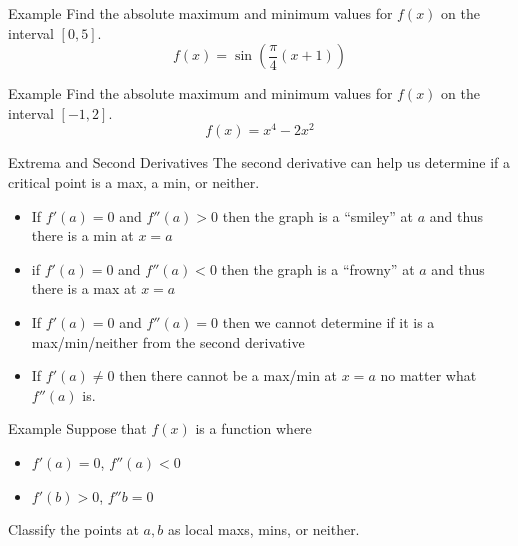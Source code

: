\documentclass[t]{beamer}
\begin{document}
\begin{frame}{Example}
Find the absolute maximum and minimum values for
$f(x)$ on the interval $[0,5]$.
$$f(x) = \sin \left( \frac{\pi}{4}(x + 1) \right)$$
\end{frame}

\begin{frame}{Example}
Find the absolute maximum and minimum values for
$f(x)$ on the interval $[-1,2]$.
$$f(x) = x^4 - 2x^2$$
\end{frame}

\begin{frame}{Extrema and Second Derivatives}
The second derivative can help us determine if a 
critical point is a max, a min, or neither.
\begin{itemize}
\item If $f'(a) = 0$ and $f''(a) > 0$ then the graph is a
``smiley'' at $a$ and thus there is a min at $x = a$
\item if $f'(a) = 0$ and $f''(a) < 0$ then the graph is a 
``frowny'' at $a$ and thus there is a max at $x = a$
\item If $f'(a) = 0$ and $f''(a) = 0$ then we cannot determine
if it is a max/min/neither from the second derivative
\item If $f'(a) \neq 0$ then there cannot be a max/min at
$x = a$ no matter what $f''(a)$ is.
\end{itemize}
\end{frame}

\begin{frame}{Example}
Suppose that $f(x)$ is a function where
\begin{itemize}
\item $f'(a) = 0$, $f''(a) < 0$
\item $f'(b) > 0$, $f'' b = 0$
\end{itemize}
Classify the points at $a,b$ as local maxs, mins, or neither.
\end{frame}
\end{document}
